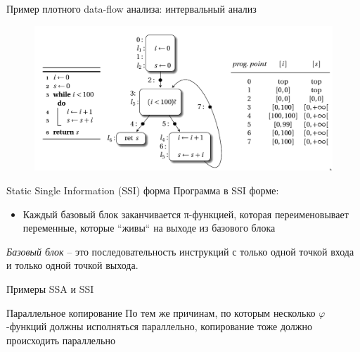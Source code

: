 \documentclass[aspectratio=169
  , xcolor={svgnames}
  , hyperref={ colorlinks,citecolor=DeepPink4
             , linkcolor=DarkRed,urlcolor=DarkBlue}
  , russian
  ]{beamer}
\theoremstyle{exerciseStyle1}
\begin{document}
\begin{frame}[fragile]{Пример плотного data-flow анализа: интервальный анализ}
\begin{figure}
\centering
\includegraphics[height=.85\textheight]{figures/dense-range-analysis}
\end{figure}
\end{frame}

\begin{frame}[fragile]{Static Single Information (SSI) форма}
Программа в SSI форме:
\begin{itemize}
\item Каждый базовый блок заканчивается π-функцией, которая переименовывает переменные, которые ``живы`` на выходе из базового блока
\end{itemize}

\begin{figure}
\centering

\end{figure}
\emph{Базовый блок} -- это последовательность инструкций с только одной точкой входа и только одной точкой выхода.
\end{frame}

\begin{frame}[fragile]{Примеры SSA и SSI}
\begin{figure}
\centering

\end{figure}
\end{frame}


\begin{frame}[fragile]{Параллельное копирование}
По тем же причинам, по которым несколько $\varphi$-функций должны исполняться параллельно, копирование тоже должно происходить параллельно
\begin{figure}
\centering

\end{figure}
\end{frame}
\end{document}
